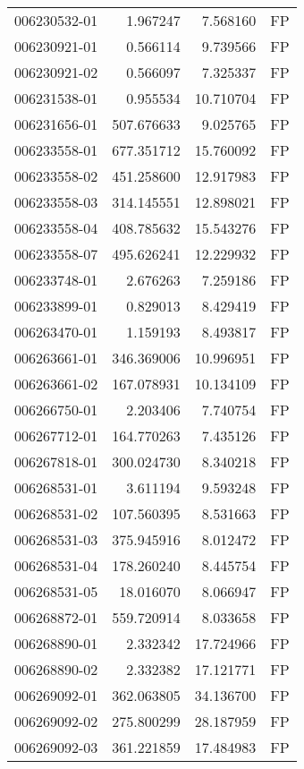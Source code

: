 \begin{tabular}{lrrl}
006230532-01 &    1.967247 &     7.568160 &   FP \\
006230921-01 &    0.566114 &     9.739566 &   FP \\
006230921-02 &    0.566097 &     7.325337 &   FP \\
006231538-01 &    0.955534 &    10.710704 &   FP \\
006231656-01 &  507.676633 &     9.025765 &   FP \\
006233558-01 &  677.351712 &    15.760092 &   FP \\
006233558-02 &  451.258600 &    12.917983 &   FP \\
006233558-03 &  314.145551 &    12.898021 &   FP \\
006233558-04 &  408.785632 &    15.543276 &   FP \\
006233558-07 &  495.626241 &    12.229932 &   FP \\
006233748-01 &    2.676263 &     7.259186 &   FP \\
006233899-01 &    0.829013 &     8.429419 &   FP \\
006263470-01 &    1.159193 &     8.493817 &   FP \\
006263661-01 &  346.369006 &    10.996951 &   FP \\
006263661-02 &  167.078931 &    10.134109 &   FP \\
006266750-01 &    2.203406 &     7.740754 &   FP \\
006267712-01 &  164.770263 &     7.435126 &   FP \\
006267818-01 &  300.024730 &     8.340218 &   FP \\
006268531-01 &    3.611194 &     9.593248 &   FP \\
006268531-02 &  107.560395 &     8.531663 &   FP \\
006268531-03 &  375.945916 &     8.012472 &   FP \\
006268531-04 &  178.260240 &     8.445754 &   FP \\
006268531-05 &   18.016070 &     8.066947 &   FP \\
006268872-01 &  559.720914 &     8.033658 &   FP \\
006268890-01 &    2.332342 &    17.724966 &   FP \\
006268890-02 &    2.332382 &    17.121771 &   FP \\
006269092-01 &  362.063805 &    34.136700 &   FP \\
006269092-02 &  275.800299 &    28.187959 &   FP \\
006269092-03 &  361.221859 &    17.484983 &   FP \\

\end{tabular}
